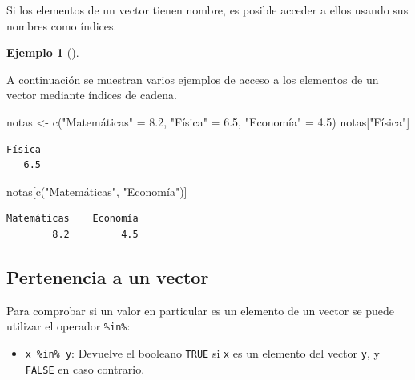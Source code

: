 \documentclass[
  a4paper,
]{scrreport}
\newenvironment{Shaded}{\begin{snugshade}}{\end{snugshade}}
\newcommand{\FloatTok}[1]{\textcolor[rgb]{0.68,0.00,0.00}{#1}}
\newcommand{\FunctionTok}[1]{\textcolor[rgb]{0.28,0.35,0.67}{#1}}
\newcommand{\NormalTok}[1]{\textcolor[rgb]{0.00,0.23,0.31}{#1}}
\newcommand{\OtherTok}[1]{\textcolor[rgb]{0.00,0.23,0.31}{#1}}
\newcommand{\StringTok}[1]{\textcolor[rgb]{0.13,0.47,0.30}{#1}}
\providecommand{\tightlist}{%
  \setlength{\itemsep}{0pt}\setlength{\parskip}{0pt}}\usepackage{longtable,booktabs,array}
\theoremstyle{definition}
\newtheorem{example}{Ejemplo}[chapter]
\theoremstyle{definition}
\theoremstyle{remark}
\begin{document}
Si los elementos de un vector tienen nombre, es posible acceder a ellos
usando sus nombres como índices.

\leavevmode{}%
\begin{example}[]\label{exm-acceso-vector-nombres}

A continuación se muestran varios ejemplos de acceso a los elementos de
un vector mediante índices de cadena.

\begin{Shaded}
\begin{Highlighting}[]
\NormalTok{notas }\OtherTok{\textless{}{-}} \FunctionTok{c}\NormalTok{(}\StringTok{"Matemáticas"} \OtherTok{=} \FloatTok{8.2}\NormalTok{, }\StringTok{"Física"} \OtherTok{=} \FloatTok{6.5}\NormalTok{, }\StringTok{"Economía"} \OtherTok{=} \FloatTok{4.5}\NormalTok{)}
\NormalTok{notas[}\StringTok{"Física"}\NormalTok{]}
\end{Highlighting}
\end{Shaded}

\begin{verbatim}
Física 
   6.5 
\end{verbatim}

\begin{Shaded}
\begin{Highlighting}[]
\NormalTok{notas[}\FunctionTok{c}\NormalTok{(}\StringTok{"Matemáticas"}\NormalTok{, }\StringTok{"Economía"}\NormalTok{)]}
\end{Highlighting}
\end{Shaded}

\begin{verbatim}
Matemáticas    Economía 
        8.2         4.5 
\end{verbatim}

\end{example}

\hypertarget{pertenencia-a-un-vector}{%
\subsection{Pertenencia a un vector}\label{pertenencia-a-un-vector}}

Para comprobar si un valor en particular es un elemento de un vector se
puede utilizar el operador \texttt{\%in\%}:

\begin{itemize}
\tightlist
\item
  \texttt{x\ \%in\%\ y}: Devuelve el booleano \texttt{TRUE} si
  \texttt{x} es un elemento del vector \texttt{y}, y \texttt{FALSE} en
  caso contrario.
\end{itemize}
\end{document}
